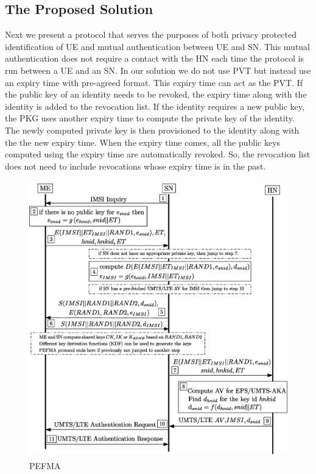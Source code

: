 \documentclass{river-journal}
\begin{document}
\subsection{The Proposed Solution}
Next we present a protocol that serves the purposes of both privacy protected identification of UE and mutual authentication between UE and SN. This mutual authentication does not require a contact with the HN each time the protocol is run between a UE and an SN. In our solution we do not use PVT but instead use an expiry time with pre-agreed format. This expiry time can act as the PVT. If the public key of an identity needs to be revoked, the expiry time along with the identity is added to the revocation list. If the identity requires a new public key, the PKG uses another expiry time to compute the private key of the identity. The newly computed private key is then provisioned to the identity along with the the new expiry time. When the expiry time comes, all the public keys computed using the expiry time are automatically revoked. So, the revocation list does not need to include revocations whose expiry time is in the past.






\begin{figure}
\begin{center}
  \includegraphics[height=12cm]{PEFMA.eps}
\caption{PEFMA}
\label{fig:PEFMA}       %
\end{center}
\end{figure}
\end{document}
